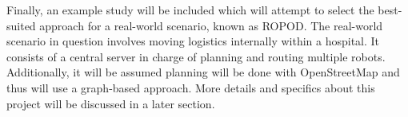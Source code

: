 Finally, an example study will be included which will attempt to select the
best-suited approach for a real-world scenario, known as ROPOD. The real-world
scenario in question involves moving logistics internally within a hospital.
It consists of a central server in charge of planning and routing multiple
robots.  Additionally, it will be assumed planning will be done with
OpenStreetMap and thus will use a graph-based approach. More details and
specifics about this project will be discussed in a later section. \\

